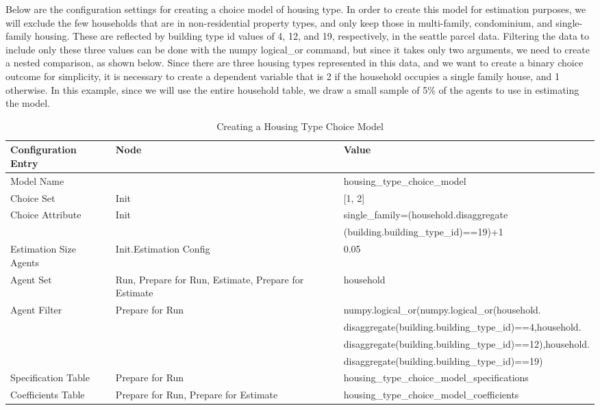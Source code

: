 Below are the configuration settings for creating a choice model of housing type.  In order to create this model for estimation purposes, we will exclude the few households that are in non-residential property types, and only keep those in multi-family, condominium, and single-family housing.  These are reflected by building type id values of 4, 12, and 19, respectively, in the seattle parcel data.  Filtering the data to include only these three values can be done with the numpy logical\_or command, but since it takes only two arguments, we need to create a nested comparison, as shown below.  Since there are three housing types represented in this data, and we want to create a binary choice outcome for simplicity, it is necessary to create a dependent variable that is 2 if the household occupies a single family house, and 1 otherwise.  In this example, since we will use the entire household table, we draw a small sample of 5\% of the agents to use in estimating the model.

\begin{table}[htp]
\caption{Creating a Housing Type Choice Model}
\label{tab:housing-type-choice-model}
\begin{center}
\begin{tabular}{ p{1.2in}  p{1.2in} p{3.2in}  }
\toprule[1.5pt]
Configuration Entry & Node & Value \\
\midrule
Model Name & & housing\_type\_choice\_model \\
Choice Set & Init & [1, 2] \\
Choice Attribute & Init & single\_family=(household.disaggregate\\ & & (building.building\_type\_id)==19)+1 \\
Estimation Size Agents & Init.Estimation Config & 0.05 \\
Agent Set & Run, Prepare for Run, Estimate, Prepare for Estimate & household \\
Agent Filter & Prepare for Run & numpy.logical\_or(numpy.logical\_or(household.\\ & & disaggregate(building.building\_type\_id)==4,household. \\ & & disaggregate(building.building\_type\_id)==12),household.\\ & & disaggregate(building.building\_type\_id)==19) \\
Specification Table & Prepare for Run & housing\_type\_choice\_model\_specifications \\
Coefficients Table & Prepare for Run, Prepare for Estimate & housing\_type\_choice\_model\_coefficients \\
\bottomrule
\end{tabular}
\end{center}
\end{table}

